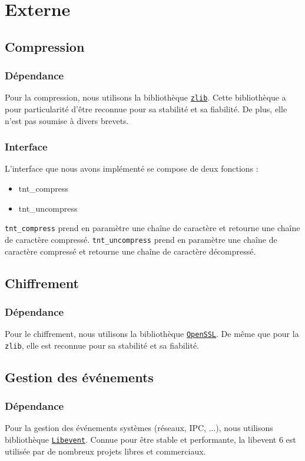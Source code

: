﻿\section{Externe}
\subsection{Compression}
\subsubsection{Dépendance}
Pour la compression, nous utilisons la bibliothèque \href{http://zlib.net/}{\texttt{zlib}}.
Cette bibliothèque a pour particularité d'être reconnue pour sa stabilité et sa fiabilité.
De plus, elle n'est pas soumise à divers brevets.

\subsubsection{Interface}
L'interface que nous avons implémenté se compose de deux fonctions :
\begin{itemize}
\item tnt\_compress
\item tnt\_uncompress
\end{itemize}

\texttt{tnt\_compress} prend en paramètre une chaîne de caractère et retourne une chaîne de caractère compressé.
\texttt{tnt\_uncompress} prend en paramètre une chaîne de caractère compressé et retourne une chaîne de caractère décompressé.

\subsection{Chiffrement}
\subsubsection{Dépendance}
Pour le chiffrement, nous utilisons la bibliothèque \href{http://www.openssl.org/}{\texttt{OpenSSL}}.
De même que pour la \texttt{zlib}, elle est reconnue pour sa stabilité et sa fiabilité.


\subsection{Gestion des événements}
\subsubsection{Dépendance}
Pour la gestion des événements systèmes (réseaux, IPC, ...), nous utilisons bibliothèque \href{http://libevent.org/}{\texttt{Libevent}}.
Connue pour être stable et performante, la libevent 6 est utilisée
par de nombreux projets libres et commerciaux.
